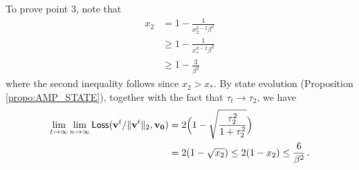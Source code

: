 \documentclass[11pt]{article}
\theoremstyle{definition}
\def\Loss{{\sf Loss}}
\def\bv{\mathbf{v}}
\def\bvz{\mathbf{v_0}}
\begin{document}
To prove point 3, note that
%
\begin{align}
%
x_2 &= 1 -\frac{1}{x_2^{k-2}\beta^2} \\
&\ge 1- \frac{1}{x_*^{k-2}\beta^2} \\
& \ge 1-\frac{3}{\beta^2}
%
\end{align}
%
where the second inequality follows since $x_2>x_*$.
By state evolution (Proposition  \ref{propo:AMP_STATE}),
together with the fact that $\tau_t\to\tau_2$,
we have
%
\begin{align}
%
\lim_{t \to \infty} \lim_{n \to \infty}  \Loss(\bv^t /
\|\bv^t\|_2,\bvz) &= 2 \Big(1-\sqrt{\frac{\tau_2^2}{1+\tau_2^2}}\Big) \\
&= 2(1-\sqrt{x_2})\le 2(1-x_2) \le \frac{6}{\beta^2}\,.
%
\end{align}
%


\end{document}
